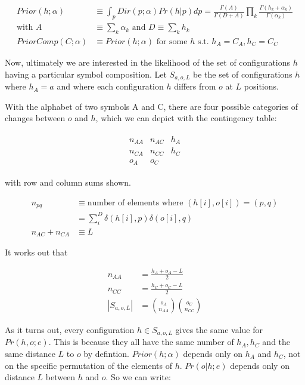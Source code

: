 \documentclass{article}
\begin{document}
\begin{align}
Prior(h;\alpha) & \equiv \int_p{Dir(p;\alpha) Pr(h|p)dp}
= \frac{\Gamma(A)}{\Gamma(D+A)}
\prod_k \frac{\Gamma(h_k+\alpha_k)}{\Gamma(\alpha_k)} \\
\text{with } A & \equiv \sum_k \alpha_k \text{ and } D \equiv \sum_k h_k \nonumber \\
PriorComp(C;\alpha) & \equiv Prior(h;\alpha) \text{ for some } h \text{ s.t. } h_A = C_A, h_C = C_C
\end{align}

Now, ultimately we are interested in the likelihood of the set of
configurations $h$ having a particular symbol composition. Let
$S_{a,o,L}$ be the set of configurations $h$ where $h_A = a$ and where
each configuration $h$ differs from $o$ at $L$ positions.

With the alphabet of two symbols A and C, there are four possible
categories of changes between $o$ and $h$, which we can depict with
the contingency table:

\begin{align*}
  \begin{matrix}
    n_{AA} & n_{AC} & h_A \\
    n_{CA} & n_{CC} & h_C \\
    o_A & o_C
  \end{matrix}
\end{align*}

with row and column sums shown.

\begin{align*}
  n_{pq} & \equiv \text{number of elements where } (h[i],o[i]) = (p,q) \\
  & = \sum_{i}^{D} \delta(h[i],p) \delta(o[i],q) \\
  n_{AC} + n_{CA} & \equiv L
\end{align*}

It works out that

\begin{align}
  n_{AA} & = \frac{h_A + o_A - L}{2} \nonumber \\
  n_{CC} & = \frac{h_C + o_C - L}{2} \nonumber \\
  |S_{a,o,L}| & = {o_A \choose n_{AA}}{o_C \choose n_{CC}}
\end{align}

As it turns out, every configuration $h \in S_{a,o,L}$ gives the same
value for $Pr(h, o; e)$.  This is because they all have the same
number of $h_A, h_C$ and the same distance $L$ to $o$ by defintion.
$Prior(h;\alpha)$ depends only on $h_A$ and $h_C$, not on the specific
permutation of the elements of $h$.  $Pr(o|h;e)$ depends only on
distance $L$ between $h$ and $o$. So we can write:
\end{document}
